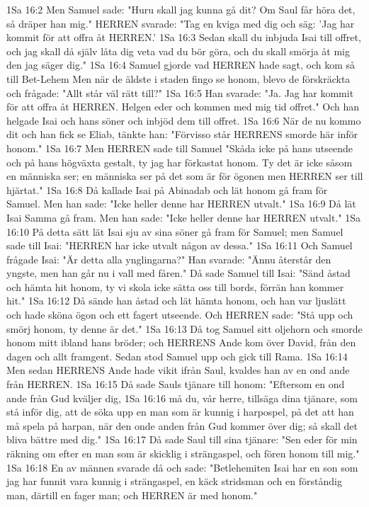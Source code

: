 1Sa 16:2  Men Samuel sade: "Huru skall jag kunna gå dit? Om Saul får höra det, så dräper han mig." HERREN svarade: "Tag en kviga med dig och säg: 'Jag har kommit för att offra åt HERREN.'
1Sa 16:3  Sedan skall du inbjuda Isai till offret, och jag skall då själv låta dig veta vad du bör göra, och du skall smörja åt mig den jag säger dig."
1Sa 16:4  Samuel gjorde vad HERREN hade sagt, och kom så till Bet-Lehem Men när de äldste i staden fingo se honom, blevo de förskräckta och frågade: "Allt står väl rätt till?"
1Sa 16:5  Han svarade: "Ja. Jag har kommit för att offra åt HERREN. Helgen eder och kommen med mig tid offret." Och han helgade Isai och hans söner och inbjöd dem till offret.
1Sa 16:6  När de nu kommo dit och han fick se Eliab, tänkte han: "Förvisso står HERRENS smorde här inför honom."
1Sa 16:7  Men HERREN sade till Samuel "Skåda icke på hans utseende och på hans högväxta gestalt, ty jag har förkastat honom. Ty det är icke såsom en människa ser; en människa ser på det som är för ögonen men HERREN ser till hjärtat."
1Sa 16:8  Då kallade Isai på Abinadab och lät honom gå fram för Samuel. Men han sade: "Icke heller denne har HERREN utvalt."
1Sa 16:9  Då lät Isai Samma gå fram. Men han sade: "Icke heller denne har HERREN utvalt."
1Sa 16:10  På detta sätt lät Isai sju av sina söner gå fram för Samuel; men Samuel sade till Isai: "HERREN har icke utvalt någon av dessa."
1Sa 16:11  Och Samuel frågade Isai: "Är detta alla ynglingarna?" Han svarade: "Ännu återstår den yngste, men han går nu i vall med fåren." Då sade Samuel till Isai: "Sänd åstad och hämta hit honom, ty vi skola icke sätta oss till bords, förrän han kommer hit."
1Sa 16:12  Då sände han åstad och lät hämta honom, och han var ljuslätt och hade sköna ögon och ett fagert utseende. Och HERREN sade: "Stå upp och smörj honom, ty denne är det."
1Sa 16:13  Då tog Samuel sitt oljehorn och smorde honom mitt ibland hans bröder; och HERRENS Ande kom över David, från den dagen och allt framgent. Sedan stod Samuel upp och gick till Rama.
1Sa 16:14  Men sedan HERRENS Ande hade vikit ifrån Saul, kvaldes han av en ond ande från HERREN.
1Sa 16:15  Då sade Sauls tjänare till honom: "Eftersom en ond ande från Gud kväljer dig,
1Sa 16:16  må du, vår herre, tillsäga dina tjänare, som stå inför dig, att de söka upp en man som är kunnig i harpospel, på det att han må spela på harpan, när den onde anden från Gud kommer över dig; så skall det bliva bättre med dig."
1Sa 16:17  Då sade Saul till sina tjänare: "Sen eder för min räkning om efter en man som är skicklig i strängaspel, och fören honom till mig."
1Sa 16:18  En av männen svarade då och sade: "Betlehemiten Isai har en son som jag har funnit vara kunnig i strängaspel, en käck stridsman och en förståndig man, därtill en fager man; och HERREN är med honom."
